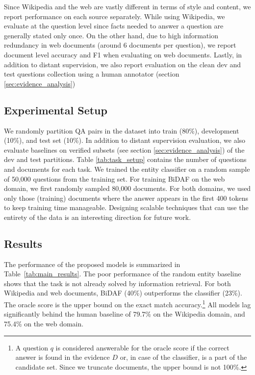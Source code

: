 Since Wikipedia and the web are vastly different in terms of style and content, we report performance on each source separately. While using Wikipedia, we evaluate at the question level since facts needed to answer a question are generally stated only once. On the other hand, due to high information redundancy in web documents (around 6 documents per question), we report document level accuracy and F1 when evaluating on web documents. Lastly, in addition to distant supervision, we also report evaluation on the clean dev and test questions collection using a human annotator (section \ref{sec:evidence_analysis})

\label{sec:expt_setup}
\subsection{Experimental Setup} We randomly partition QA pairs in the dataset into train (80\%), development (10\%), and test set (10\%). In addition to distant supervision evaluation, we also evaluate baselines on verified subsets (see section \ref{sec:evidence_analysis}) of the dev and test partitions. Table \ref{tab:task_setup} contains the number of questions and documents for each task. We trained the entity classifier on a random sample of 50,000 questions from the training set. For training BiDAF on the web domain, we first randomly sampled 80,000 documents. For both domains, we used only those (training) documents where the answer appears in the first 400 tokens to keep training time manageable. Designing scalable techniques that can use the entirety of the data is an interesting direction for future work.

\subsection{Results}
The performance of the proposed models is summarized in Table~\ref{tab:main_results}. The poor performance of the random entity baseline shows that the task is not already solved by information retrieval. For both Wikipedia and web documents, BiDAF (40\%) outperforms the classifier (23\%). The oracle score is the upper bound on the exact match accuracy.\footnote{A question $q$ is considered answerable for the oracle score if the correct answer is found in the evidence $D$ or, in case of the classifier, is a part of the candidate set. Since we truncate documents, the upper bound is not 100\%.} All models lag significantly behind the human baseline of 79.7\% on the Wikipedia domain, and 75.4\% on the web domain.

